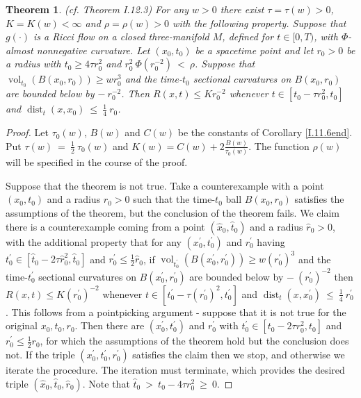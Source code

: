 \documentclass[12pt]{amsart}
\newcommand{\dist}{\operatorname{dist}}
\newcommand{\vol}{\operatorname{vol}}
\numberwithin{equation}{section}
\theoremstyle{plain}
\newtheorem{theorem}[equation]{Theorem}
\theoremstyle{definition}
\theoremstyle{remark}
\begin{document}
\begin{theorem} (cf. Theorem I.12.3) \label{thmI.12.3}
For any $w > 0$ there exist $\tau = \tau(w) > 0$, $K = K(w) < \infty$ and
$\rho = \rho(w) > 0$ with the following property.  Suppose that
$g(\cdot)$ is a Ricci flow on a closed three-manifold $M$, defined for
$t \in [0, T)$, with $\Phi$-almost nonnegative curvature. Let $(x_0, t_0)$
be a spacetime point and let $r_0 > 0$ be a radius with $t_0 \ge 4 \tau r_0^2$
and 
$r_0^2 \: \Phi(r_0^{-2}) \: < \: \rho$.
Suppose that $\vol_{t_0}(B(x_0,r_0)) \ge w r_0^3$ and
the time-$t_0$ sectional curvatures on $B(x_0, r_0)$ are bounded below by
$- \: r_0^{-2}$. Then $R(x,t) \le K r_0^{-2}$ whenever
$t \in [t_0 - \tau r_0^2, t_0]$ and
$\dist_t(x, x_0) \: \le \: \frac14 \: r_0$.
\end{theorem}
\begin{proof}
Let $\tau_0(w)$, $B(w)$ and $C(w)$ be the constants of Corollary
\ref{I.11.6end}. Put $\tau(w) \: = \: \frac12 \: \tau_0(w)$ and
$K(w) = C(w) + 2 \frac{B(w)}{\tau_0(w)}$. The function $\rho(w)$ 
will be specified in the course of the proof.

Suppose that the theorem is not true. Take a counterexample with
a point $(x_0, t_0)$ and a radius $r_0 > 0$ such that the
time-$t_0$ ball $B(x_0, r_0)$ satisfies
the assumptions of the theorem, but the conclusion of the theorem
fails.  We claim there is a counterexample coming from a point 
$(\widehat{x}_0, \widehat{t}_0)$
and a radius $\widehat{r}_0 > 0$, with the additional property that for any
$(x^\prime_0, t^\prime_0)$ and $r^\prime_0$ having
$t^\prime_0 \in [\widehat{t}_0 - 2 \tau \widehat{r}_0^2, \widehat{t}_0]$ and $r^\prime_0 \le
\frac{1}{2} \widehat{r}_0$, if $\vol_{t_0^\prime}(B(x_0^\prime,r_0^\prime)) \ge w 
(r_0^\prime)^3$ and
the time-$t_0^\prime$ sectional curvatures on $B(x_0^\prime, r_0^\prime)$ 
are bounded below by
$- \: (r_0^\prime)^{-2}$ then $R(x,t) \le K (r_0^\prime)^{-2}$ whenever
$t \in [t_0^\prime - \tau (r_0^\prime)^2, t_0^\prime]$ and
$\dist_t(x, x_0^\prime) \: \le \: \frac14 \: r_0^\prime$.
This follows from a
pointpicking argument - suppose that it is not
true for the original $x_0, t_0, r_0$.  Then there are
$(x^\prime_0, t^\prime_0)$ and $r^\prime_0$ with
$t^\prime_0 \in [t_0 - 2 \tau r_0^2, t_0]$ and $r^\prime_0 \le
\frac{1}{2} r_0$, for which 
the assumptions of the theorem hold but the conclusion
does not. If the triple 
$(x^\prime_0, t^\prime_0, r^\prime_0)$ satisfies the claim then we
stop, and otherwise we iterate the procedure.  The iteration must
terminate, which provides the desired triple 
$(\widehat{x}_0, \widehat{t}_0, \widehat{r}_0)$. Note that 
$\widehat{t}_0 \: > \: t_0 - 4 \tau r_0^2 \: \ge \: 0$.


\end{proof}
\end{document}
